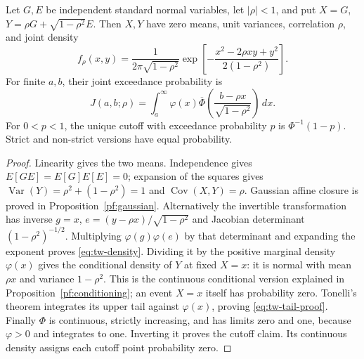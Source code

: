 \begin{proposition}
\label{tw:gaussian}
Let \(G,E\) be independent standard normal variables, let \(|\rho|<1\), and
put \(X=G\), \(Y=\rho G+\sqrt{1-\rho^2}E\). Then \(X,Y\) have zero means,
unit variances, correlation \(\rho\), and joint density
\begin{equation}
 f_\rho(x,y)=\frac{1}{2\pi\sqrt{1-\rho^2}}
 \exp\!\left[-\frac{x^2-2\rho xy+y^2}{2(1-\rho^2)}\right].
 \label{eq:tw-density}
\end{equation}
For finite \(a,b\), their joint exceedance probability is
\begin{equation}
 J(a,b;\rho)=\int_a^\infty\varphi(x)
 \overline\Phi\!\left(\frac{b-\rho x}{\sqrt{1-\rho^2}}\right)\,dx.
 \label{eq:tw-tail-proof}
\end{equation}
For \(0<p<1\), the unique cutoff with exceedance probability \(p\) is
\(\Phi^{-1}(1-p)\). Strict and non-strict versions have equal probability.
\end{proposition}
\begin{proof}
Linearity gives the two means. Independence gives \(E[GE]=E[G]E[E]=0\);
expansion of the squares gives
\(\operatorname{Var}(Y)=\rho^2+(1-\rho^2)=1\) and
\(\operatorname{Cov}(X,Y)=\rho\). Gaussian affine closure is proved in
Proposition~\ref{pf:gaussian}. Alternatively the invertible transformation has
inverse \(g=x\), \(e=(y-\rho x)/\sqrt{1-\rho^2}\) and Jacobian determinant
\((1-\rho^2)^{-1/2}\). Multiplying \(\varphi(g)\varphi(e)\) by that
determinant and expanding the exponent proves \eqref{eq:tw-density}.
Dividing it by the positive marginal density \(\varphi(x)\) gives the
conditional density of \(Y\) at fixed \(X=x\): it is normal with mean
\(\rho x\) and variance \(1-\rho^2\). This is the continuous conditional
version explained in Proposition~\ref{pf:conditioning}; an event \(X=x\) itself
has probability zero. Tonelli's theorem integrates its upper tail against
\(\varphi(x)\), proving \eqref{eq:tw-tail-proof}. Finally \(\Phi\) is
continuous, strictly increasing, and has limits zero and one, because
\(\varphi>0\) and integrates to one. Inverting it proves the cutoff claim.
Its continuous density assigns each cutoff point probability zero.
\end{proof}

